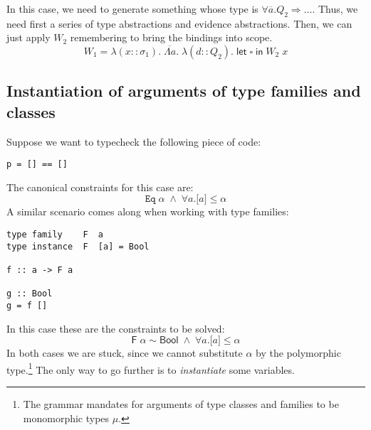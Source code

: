 \documentclass[12pt]{article}
\begin{document}
In this case, we need to generate something whose type is $\forall \overline{a}. Q_2 \Rightarrow \dots$. Thus, we need first a series of type abstractions and evidence abstractions. Then, we can just apply $W_2$ remembering to bring the bindings into scope.
$$W_1 = \lambda (x :: \sigma_1). \; \overline{\Lambda a}. \; \lambda (d :: Q_2). \; \textsf{let} \; \square \; \textsf{in} \; W_2 \; x$$

\subsection{Instantiation of arguments of type families and classes}

Suppose we want to typecheck the following piece of code:
\begin{verbatim}
p = [] == []
\end{verbatim}
The canonical constraints for this case are:
$$\mathtt{Eq} \; \alpha \; \wedge \; \forall a. \mathrm{[}a\mathrm{]} \leq \alpha$$
A similar scenario comes along when working with type families:
\begin{verbatim}
type family    F  a
type instance  F  [a] = Bool

f :: a -> F a

g :: Bool
g = f []
\end{verbatim}
In this case these are the constraints to be solved:
$$\mathsf{F} \; \alpha \sim \mathsf{Bool} \; \wedge \; \forall a. \mathrm{[}a\mathrm{]} \leq \alpha$$
In both cases we are stuck, since we cannot substitute $\alpha$ by the polymorphic type.\footnote{The grammar mandates for arguments of type classes and families to be monomorphic types $\mu$.} The only way to go further is to \emph{instantiate} some variables.

\vspace{0.3cm}
\end{document}
